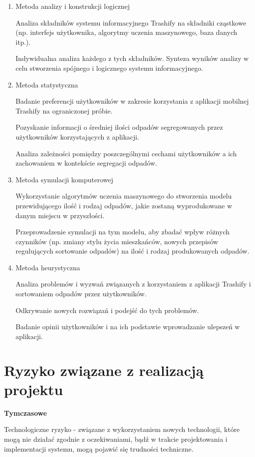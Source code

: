 \documentclass[12pt,oneside]{book}
\begin{document}
\begin{enumerate}
    \item Metoda analizy i konstrukcji logicznej
    
    Analiza składników systemu informacyjnego Trashify na składniki cząstkowe (np. interfejs użytkownika, algorytmy uczenia maszynowego, baza danych itp.).

    Indywidualna analiza każdego z tych składników.
    Synteza wyników analizy w celu stworzenia spójnego i logicznego systemu informacyjnego.
    \item Metoda statystyczna
    
    Badanie preferencji użytkowników w zakresie korzystania z aplikacji mobilnej Trashify na ograniczonej próbie.

    Pozyskanie informacji o średniej ilości odpadów segregowanych przez użytkowników korzystających z aplikacji.

    Analiza zależności pomiędzy poszczególnymi cechami użytkowników a ich zachowaniem w kontekście segregacji odpadów.    
    \item Metoda symulacji komputerowej
    
    Wykorzystanie algorytmów uczenia maszynowego do stworzenia modelu przewidującego ilość i rodzaj odpadów, jakie zostaną wyprodukowane w danym miejscu w przyszłości.
    
    Przeprowadzenie symulacji na tym modelu, aby zbadać wpływ różnych czynników (np. zmiany stylu życia mieszkańców, nowych przepisów regulujących sortowanie odpadów) na ilość i rodzaj produkowanych odpadów.

    \item Metoda heurystyczna
    
    Analiza problemów i wyzwań związanych z korzystaniem z aplikacji Trashify i sortowaniem odpadów przez użytkowników.

    Odkrywanie nowych rozwiązań i podejść do tych problemów.
    
    Badanie opinii użytkowników i na ich podstawie wprowadzanie ulepszeń w aplikacji.
\end{enumerate}

\section{Ryzyko związane z realizacją projektu}

{\Huge\textbf{Tymczasowe}}

Technologiczne ryzyko - związane z wykorzystaniem nowych technologii, które mogą nie działać zgodnie z oczekiwaniami, bądź w trakcie projektowania i implementacji systemu, mogą pojawić się trudności techniczne.
\end{document}

